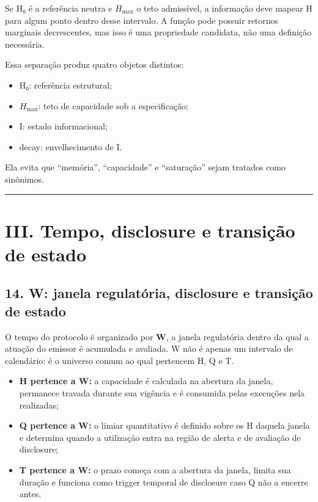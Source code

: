 \documentclass[
  a4paper,
]{article}
\providecommand{\tightlist}{%
  \setlength{\itemsep}{0pt}\setlength{\parskip}{0pt}}
\begin{document}
Se H₀ é a referência neutra e \(H_{\max}\) o teto admissível, a
informação deve mapear H para algum ponto dentro desse intervalo. A
função pode possuir retornos marginais decrescentes, mas isso é uma
propriedade candidata, não uma definição necessária.

Essa separação produz quatro objetos distintos:

\begin{itemize}
\tightlist
\item
  H₀: referência estrutural;
\item
  \(H_{\max}\): teto de capacidade sob a especificação;
\item
  I: estado informacional;
\item
  decay: envelhecimento de I.
\end{itemize}

Ela evita que ``memória'', ``capacidade'' e ``saturação'' sejam tratados
como sinônimos.

\begin{center}\rule{0.5\linewidth}{0.5pt}\end{center}

\hypertarget{iii-tempo-disclosure-e-transicao-de-estado}{}

\hypertarget{iii-tempo-disclosure-e-transiuxe7uxe3o-de-estado-1}{%
\section{III. Tempo, disclosure e transição de
estado}\label{iii-tempo-disclosure-e-transiuxe7uxe3o-de-estado-1}}

\hypertarget{14-w-janela-regulatoria-disclosure-e-transicao-de-estado}{}

\hypertarget{14-w-janela-regulatuxf3ria-disclosure-e-transiuxe7uxe3o-de-estado}{%
\subsection{14. W: janela regulatória, disclosure e transição de
estado}\label{14-w-janela-regulatuxf3ria-disclosure-e-transiuxe7uxe3o-de-estado}}

O tempo do protocolo é organizado por \textbf{W}, a janela regulatória
dentro da qual a atuação do emissor é acumulada e avaliada. W não é
apenas um intervalo de calendário: é o universo comum ao qual pertencem
H, Q e T.

\begin{itemize}
\tightlist
\item
  \textbf{H pertence a W:} a capacidade é calculada na abertura da
  janela, permanece travada durante sua vigência e é consumida pelas
  execuções nela realizadas;
\item
  \textbf{Q pertence a W:} o limiar quantitativo é definido sobre os H
  daquela janela e determina quando a utilização entra na região de
  alerta e de avaliação de disclosure;
\item
  \textbf{T pertence a W:} o prazo começa com a abertura da janela,
  limita sua duração e funciona como trigger temporal de disclosure caso
  Q não a encerre antes.
\end{itemize}
\end{document}

